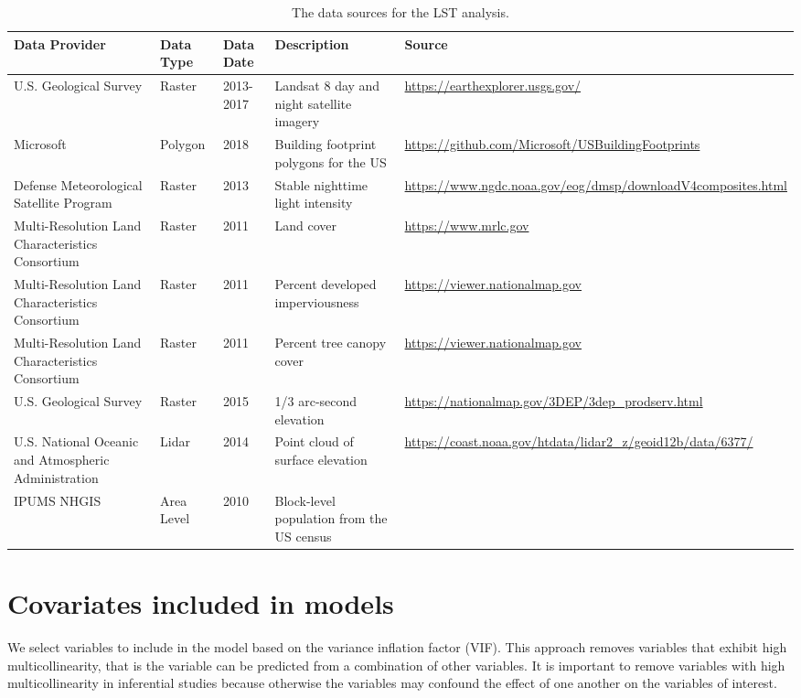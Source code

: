 \documentclass[review]{elsarticle}
\begin{document}
\begin{table}[H]
\caption{The data sources for the LST analysis.}
\label{tab:data}
\fontsize{8}{11}\selectfont
\begin{tabu}to \textwidth{ X[l]  X[c]  X[c] X[l] X[l] }
\toprule
 Data Provider & Data Type & Data Date & Description & Source \\
 \hline
U.S. Geological Survey  & Raster  & 2013-2017 &
    Landsat 8 day and night satellite imagery & \url{https://earthexplorer.usgs.gov/} \\
Microsoft  & Polygon  & 2018 & Building footprint polygons for the US &
    \url{https://github.com/Microsoft/USBuildingFootprints} \\
Defense Meteorological Satellite Program  & Raster  & 2013 &
    Stable nighttime light intensity & \url{https://www.ngdc.noaa.gov/eog/dmsp/downloadV4composites.html} \\
Multi-Resolution Land Characteristics Consortium  & Raster  & 2011 &
    Land cover & \url{https://www.mrlc.gov} \\
Multi-Resolution Land Characteristics Consortium  & Raster  & 2011 &
    Percent developed imperviousness & \url{https://viewer.nationalmap.gov} \\
Multi-Resolution Land Characteristics Consortium  & Raster  & 2011 &
    Percent tree canopy cover & \url{https://viewer.nationalmap.gov} \\
U.S. Geological Survey  & Raster  & 2015 & 1/3 arc-second elevation &
    \url{https://nationalmap.gov/3DEP/3dep_prodserv.html} \\
U.S. National Oceanic and Atmospheric Administration  & Lidar  & 2014 & Point cloud of surface elevation &
    \url{https://coast.noaa.gov/htdata/lidar2_z/geoid12b/data/6377/} \\
IPUMS NHGIS  & Area Level  & 2010 &
    Block-level population from the US census & \cite{nhgis}\\
\bottomrule
\end{tabu}

\end{table}


\newpage
\section{Covariates included in models}

We select variables to include in the model based on the variance inflation factor (VIF). 
This approach removes variables that exhibit high multicollinearity, that is the variable can be predicted from a combination of other variables. 
It is important to remove variables with high multicollinearity in inferential studies because otherwise the variables may confound the effect of one another on the variables of interest.
\end{document}
